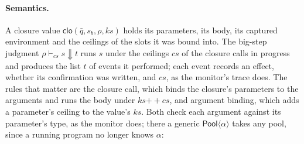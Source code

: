 \documentclass[11pt,a4paper]{article}
\newcommand{\clo}{\mathsf{clo}}
\newcommand{\app}{\mathbin{+\!\!+}}
\begin{document}
\paragraph{Semantics.} A closure value $\clo(\bar{q}, s_b, \rho, ks)$
holds its parameters, its body, its captured environment and the
ceilings of the slots it was bound into. The big-step judgment $\rho \vdash_{cs} s \Downarrow t$ runs
$s$ under the ceilings $cs$ of the closure calls in progress and produces
the list $t$ of events it performed; each event records an effect,
whether its confirmation was written, and $cs$, as the monitor's trace
does. The rules that matter are the closure call, which binds the
closure's parameters to the arguments and runs the body under
$ks \app cs$, and argument binding, which adds a parameter's ceiling to
the value's $ks$. Both check each argument against its parameter's type,
as the monitor does; there a generic $\mathsf{Pool}\langle\alpha\rangle$
takes any pool, since a running program no longer knows $\alpha$:
\end{document}
